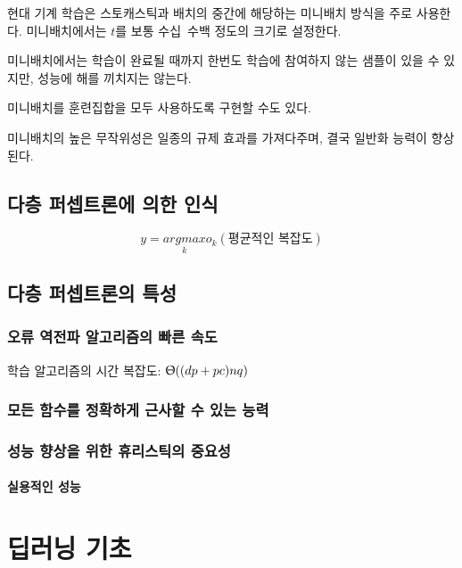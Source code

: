 \documentclass [12pt] {oblivoir}
\let\oldsubsubsection=\subsubsection
\renewcommand{\subsubsection}
{
  \filbreak
  \oldsubsubsection
}
\begin{document}
현대 기계 학습은 스토캐스틱과 배치의 중간에 해당하는 미니배치 방식을 주로 사용한다.
미니배치에서는 $t$를 보통 수십~수백 정도의 크기로 설정한다.

미니배치에서는 학습이 완료될 때까지 한번도 학습에 참여하지 않는 샘플이 있을 수 있지만, 성능에 해를 끼치지는 않는다.

미니배치를 훈련집합을 모두 사용하도록 구현할 수도 있다.

미니배치의 높은 무작위성은 일종의 규제 효과를 가져다주며, 결국 일반화 능력이 향상된다.

\subsection{다층 퍼셉트론에 의한 인식}

\begin{equation} \tag{3.26}
  y = \underset{k}{argmax}o_{k} (\text{평균적인 복잡도})
\end{equation}

\subsection{다층 퍼셉트론의 특성}

\subsubsection{오류 역전파 알고리즘의 빠른 속도}

학습 알고리즘의 시간 복잡도: $\Uptheta((dp + pc)nq)$

\subsubsection{모든 함수를 정확하게 근사할 수 있는 능력}

\subsubsection{성능 향상을 위한 휴리스틱의 중요성}

\paragraph*{실용적인 성능}\mbox{}

\vspace{3mm}

\newpage
\section{딥러닝 기초}
\end{document}
